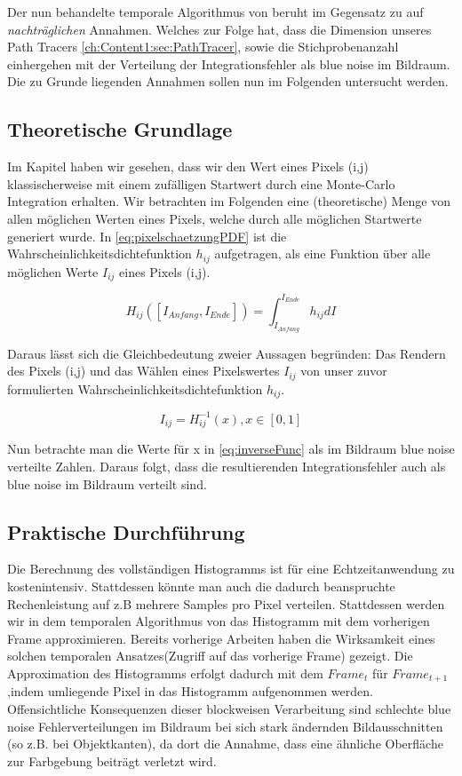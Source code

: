 Der nun behandelte temporale Algorithmus von \cite{hal02158423} beruht 
im Gegensatz zu \cite{georgiev2016blue} auf \textit{nachträglichen} 
Annahmen. Welches zur Folge hat, dass die Dimension unseres Path Tracers
\ref{ch:Content1:sec:PathTracer}, sowie die Stichprobenanzahl einhergehen 
mit der Verteilung der Integrationsfehler als blue noise im Bildraum.
Die zu Grunde liegenden Annahmen sollen nun im Folgenden untersucht werden.

\subsection{Theoretische Grundlage}
Im Kapitel  haben wir gesehen, dass 
wir den Wert eines Pixels (i,j) klassischerweise mit einem zufälligen
Startwert durch eine Monte-Carlo Integration erhalten. Wir betrachten im
Folgenden eine (theoretische) Menge von allen möglichen Werten eines 
Pixels, welche durch alle möglichen Startwerte generiert wurde.
In \ref{eq:pixelschaetzungPDF} ist die Wahrscheinlichkeitsdichtefunktion
$h_{ij}$ aufgetragen, als eine Funktion über alle möglichen Werte 
$I_{ij}$ eines Pixels (i,j).

\begin{equation}\label{eq:pixelschaetzungPDF}
    H_{ij}([I_{Anfang},I_{Ende}]) = \int_{I_{Anfang}}^{I_{Ende}} h_{ij} dI
\end{equation}

Daraus lässt sich die Gleichbedeutung zweier Aussagen begründen:
Das Rendern des Pixels (i,j) und das Wählen eines Pixelswertes $I_{ij}$
von unser zuvor formulierten Wahrscheinlichkeitsdichtefunktion $h_{ij}$.

\begin{equation}\label{eq:inverseFunc}
    I_{ij} = H_{ij}^{-1}(x), x \in [0,1]
\end{equation}

Nun betrachte man die Werte für x in \ref{eq:inverseFunc} als im Bildraum
blue noise verteilte Zahlen. Daraus folgt, dass die resultierenden
Integrationsfehler auch als blue noise im Bildraum verteilt sind.


\subsection{Praktische Durchführung}
Die Berechnung des vollständigen Histogramms ist für eine Echtzeitanwendung
zu kostenintensiv. Stattdessen könnte man auch die dadurch beanspruchte 
Rechenleistung auf z.B mehrere Samples pro Pixel verteilen.
Stattdessen werden wir in dem temporalen Algorithmus von \cite{hal02158423}
das Histogramm mit dem vorherigen Frame approximieren. 
Bereits vorherige Arbeiten \cite{Schied:2018:GER:3273023.3233301} haben die 
Wirksamkeit eines solchen temporalen Ansatzes(Zugriff auf das vorherige Frame)
gezeigt. Die Approximation des Histogramms erfolgt dadurch mit dem $Frame_{t}$ 
für $Frame_{t+1}$,indem umliegende Pixel in das Histogramm aufgenommen werden.
Offensichtliche Konsequenzen dieser blockweisen Verarbeitung sind schlechte blue noise 
Fehlerverteilungen im Bildraum bei sich stark ändernden Bildausschnitten
(so z.B. bei Objektkanten), da dort die Annahme, dass eine ähnliche Oberfläche
zur Farbgebung beiträgt verletzt wird.